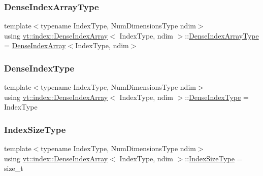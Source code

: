 \subsubsection{\texorpdfstring{Dense\+Index\+Array\+Type}{DenseIndexArrayType}}
{\footnotesize\ttfamily template$<$typename Index\+Type, Num\+Dimensions\+Type ndim$>$ \\
using \hyperlink{structvt_1_1index_1_1_dense_index_array}{vt\+::index\+::\+Dense\+Index\+Array}$<$ Index\+Type, ndim $>$\+::\hyperlink{structvt_1_1index_1_1_dense_index_array_aec95c4ed1b4071d31d24142f02429dbd}{Dense\+Index\+Array\+Type} =  \hyperlink{structvt_1_1index_1_1_dense_index_array}{Dense\+Index\+Array}$<$Index\+Type, ndim$>$}

\mbox{\label{structvt_1_1index_1_1_dense_index_array_a36698427e28045290d1fb072573275ec}} 
\subsubsection{\texorpdfstring{Dense\+Index\+Type}{DenseIndexType}}
{\footnotesize\ttfamily template$<$typename Index\+Type, Num\+Dimensions\+Type ndim$>$ \\
using \hyperlink{structvt_1_1index_1_1_dense_index_array}{vt\+::index\+::\+Dense\+Index\+Array}$<$ Index\+Type, ndim $>$\+::\hyperlink{structvt_1_1index_1_1_dense_index_array_a36698427e28045290d1fb072573275ec}{Dense\+Index\+Type} =  Index\+Type}

\mbox{\label{structvt_1_1index_1_1_dense_index_array_ae2999552165f16fc69a2940e0589819f}} 
\subsubsection{\texorpdfstring{Index\+Size\+Type}{IndexSizeType}}
{\footnotesize\ttfamily template$<$typename Index\+Type, Num\+Dimensions\+Type ndim$>$ \\
using \hyperlink{structvt_1_1index_1_1_dense_index_array}{vt\+::index\+::\+Dense\+Index\+Array}$<$ Index\+Type, ndim $>$\+::\hyperlink{structvt_1_1index_1_1_dense_index_array_ae2999552165f16fc69a2940e0589819f}{Index\+Size\+Type} =  size\+\_\+t}

